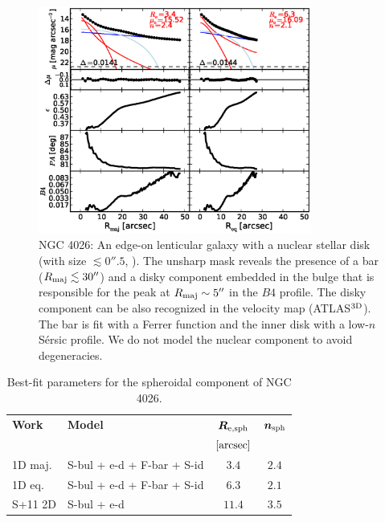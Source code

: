 \documentclass[preprint2]{emulateapj}
\newcommand{\fitfigurewidth}{0.8\textwidth}
\begin{document}
  \begin{figure}[h]
  \begin{center}
  \includegraphics[width=\fitfigurewidth]{images/n4026_1Dfit.eps}
  \caption{NGC 4026: 
  An edge-on lenticular galaxy with a nuclear stellar disk (with size $\lesssim 0''.5$, \citealt{ledo2010}).
  The unsharp mask reveals the presence of a bar ($R_{\rm maj} \lesssim 30''$) and a disky component 
  embedded in the bulge that is responsible for the peak at $R_{\rm maj} \sim 5''$ in the $B4$ profile.
  The disky component can be also recognized in the velocity map (ATLAS$^{\rm 3D}$).
  The bar is fit with a Ferrer function and the inner disk with a low-$n$ S\'ersic profile.
  We do not model the nuclear component to avoid degeneracies.
  }
  \end{center}
  \end{figure}

  \begin{table}[h]
  \small
  \caption{Best-fit parameters for the spheroidal component of NGC 4026.}
  \begin{center}
  \begin{tabular}{llcc}
  \hline
  {\bf Work} & {\bf Model}   & $\bm R_{\rm e,sph}$    & $\bm n_{\rm sph}$ \\
    &  &  $[\rm arcsec]$ & \\
  \hline
  1D maj. & S-bul + e-d + F-bar + S-id & $3.4$  &  $2.4$ \\
  1D eq.  & S-bul + e-d + F-bar + S-id & $6.3$  &  $2.1$ \\
  \hline
  S+11 2D         & S-bul + e-d & $11.4$  &  $3.5$ \\
  \hline
  \end{tabular}
  \end{center}
  \label{tab:n4026}
  \end{table}
\end{document}
